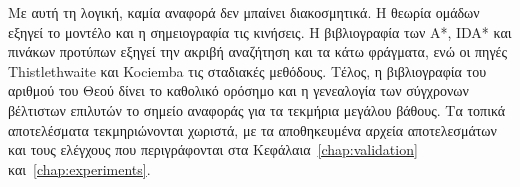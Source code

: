 Με αυτή τη λογική, καμία αναφορά δεν μπαίνει διακοσμητικά. Η θεωρία ομάδων εξηγεί το μοντέλο και η σημειογραφία τις κινήσεις. Η βιβλιογραφία των A*, IDA* και πινάκων προτύπων εξηγεί την ακριβή αναζήτηση και τα κάτω φράγματα, ενώ οι πηγές Thistlethwaite και Kociemba τις σταδιακές μεθόδους. Τέλος, η βιβλιογραφία του αριθμού του Θεού δίνει το καθολικό ορόσημο και η γενεαλογία των σύγχρονων βέλτιστων επιλυτών το σημείο αναφοράς για τα τεκμήρια μεγάλου βάθους. Τα τοπικά αποτελέσματα τεκμηριώνονται χωριστά, με τα αποθηκευμένα αρχεία αποτελεσμάτων και τους ελέγχους που περιγράφονται στα Κεφάλαια~\ref{chap:validation} και~\ref{chap:experiments}.
